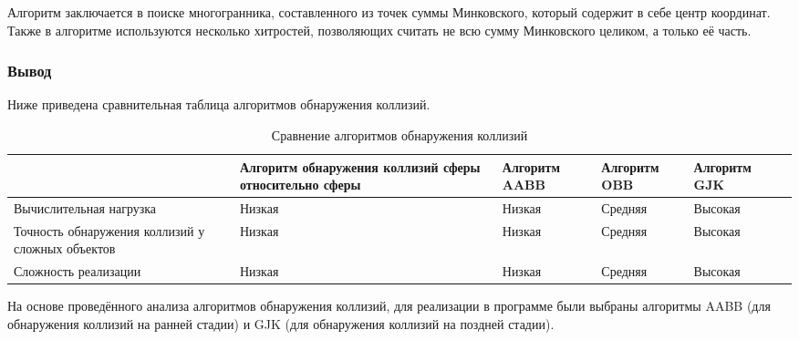 Алгоритм заключается в поиске многогранника, составленного из точек суммы Минковского, который содержит в себе центр координат.
Также в алгоритме используются несколько хитростей, позволяющих считать не всю сумму Минковского целиком, а только её часть.

\subsubsection*{Вывод}

Ниже приведена сравнительная таблица алгоритмов обнаружения коллизий.

\noindent
\begin{table}[H]
    \caption{Сравнение алгоритмов обнаружения коллизий}
    \label{tab:collisions}
\begin{adjustbox}{width=1\textwidth}
    \begin{tabular}{|p{}|p{}|p{}|p{}|p{}|p{}|}
        \hline
        &
        Алгоритм обнаружения коллизий сферы относительно сферы
        &
        Алгоритм AABB
        &
        Алгоритм OBB
        &
        Алгоритм GJK
        \\
        \hline
        Вычислительная нагрузка
        &
        Низкая
        &
        Низкая
        &
        Средняя
        &
        Высокая
        \\
        \hline
        Точность обнаружения коллизий у сложных объектов
        &
        Низкая
        &
        Низкая
        &
        Средняя
        &
        Высокая
        \\
        \hline
        Сложность реализации
        &
        Низкая
        &
        Низкая
        &
        Средняя
        &
        Высокая
        \\
        \hline
    \end{tabular}
\end{adjustbox}
\end{table}

На основе проведённого анализа алгоритмов обнаружения коллизий, для реализации в программе были выбраны алгоритмы AABB (для обнаружения коллизий на ранней стадии) и GJK (для обнаружения коллизий на поздней стадии).

